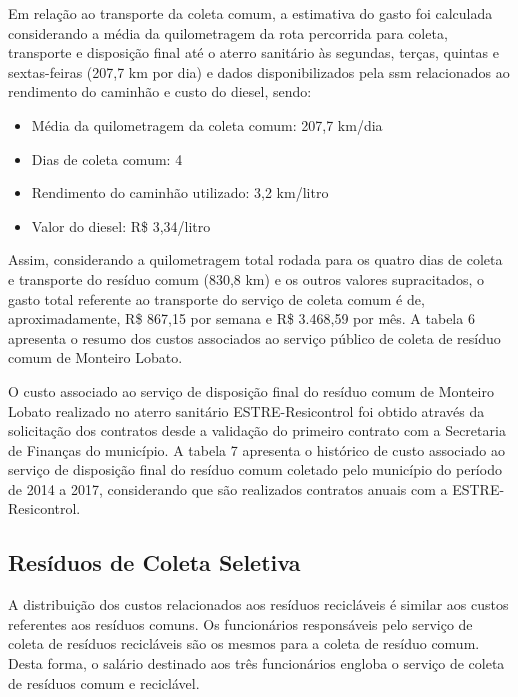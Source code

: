 	Em relação ao transporte da coleta comum, a estimativa do gasto foi calculada considerando a média da quilometragem da rota percorrida para coleta, transporte e disposição final até o aterro sanitário às segundas, terças, quintas e sextas-feiras (207,7 km por dia) e dados disponibilizados pela \gls{ssm} relacionados ao rendimento do caminhão e custo do diesel, sendo:
	
	\begin{itemize}
		\item Média da quilometragem da coleta comum: 207,7 km/dia
		\item Dias de coleta comum: 4
		\item Rendimento do caminhão utilizado: 3,2 km/litro
		\item Valor do diesel: R\$ 3,34/litro
	\end{itemize} 
	
	Assim, considerando a quilometragem total rodada para os quatro dias de coleta e transporte do resíduo comum (830,8 km) e os outros valores supracitados, o gasto total referente ao transporte do serviço de coleta comum é de, aproximadamente, R\$ 867,15 por semana e R\$ 3.468,59 por mês. A tabela 6 apresenta o resumo dos custos associados ao serviço público de coleta de resíduo comum de Monteiro Lobato.
	
	
	
	O custo associado ao serviço de disposição final do resíduo comum de Monteiro Lobato realizado no aterro sanitário ESTRE-Resicontrol foi obtido através da solicitação dos contratos desde a validação do primeiro contrato com a Secretaria de Finanças do município. A tabela 7 apresenta o histórico de custo associado ao serviço de disposição final do resíduo comum coletado pelo município do período de 2014 a 2017, considerando que são realizados contratos anuais com a ESTRE-Resicontrol.
	
	
	
	\subsection{Resíduos de Coleta Seletiva}
	A distribuição dos custos relacionados aos resíduos recicláveis é similar aos custos referentes aos resíduos comuns. Os funcionários responsáveis pelo serviço de coleta de resíduos recicláveis são os mesmos para a coleta de resíduo comum. Desta forma, o salário destinado aos três funcionários engloba o serviço de coleta de resíduos comum e reciclável.
	
